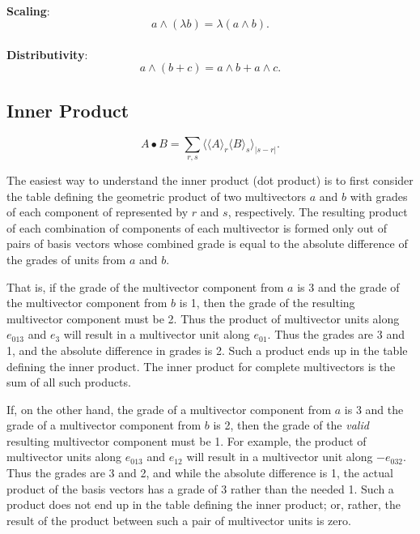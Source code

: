 \documentclass{article}
\begin{document}
\paragraph{}\textbf{Scaling}:
$$a \wedge (\lambda b) = \lambda (a \wedge b).$$
\paragraph{}\textbf{Distributivity}:
$$a \wedge (b + c) = a \wedge b + a \wedge c.$$


\subsection{\textbf{Inner Product}}

$$A\bullet B = \sum_{r,s} \langle \langle A \rangle_{r} \langle B \rangle_{s} \rangle_{\vert s - r \vert}.$$

The easiest way to understand the inner product (dot product) is to first consider the table defining the geometric product 
of two multivectors $a$ and $b$ with grades of each component of represented by $r$ and $s$, respectively.
The resulting product of each combination of components of each multivector is formed only out of pairs of basis 
vectors whose combined grade is equal to the absolute difference of the grades of units from $a$ and $b$.

That is, if the grade of the multivector component from $a$ is 3 and the grade of the multivector component from $b$ is 1, 
then the grade of the resulting multivector component must be 2. Thus the product of multivector units along $e_{013}$ and $e_{3}$
will result in a multivector unit along $e_{01}$. Thus the grades are 3 and 1, and the absolute difference in grades is 2. Such a product
ends up in the table defining the inner product. The inner product for complete multivectors is the sum of all such products. 

If, on the other hand, the grade of a multivector component from $a$ is 3 and the grade of a multivector component from $b$ is 2, 
then the grade of the \textit{valid} resulting multivector component must be 1. 
For example, the product of multivector units along $e_{013}$ and $e_{12}$ will result in a multivector unit 
along $-e_{032}$. Thus the grades are 3 and 2, and while the absolute difference is 1, the actual
product of the basis vectors has a grade of 3 rather than the needed 1. Such a product does not end up in the table defining the inner product; 
or, rather, the result of the product between such a pair of multivector units is zero.
\end{document}
